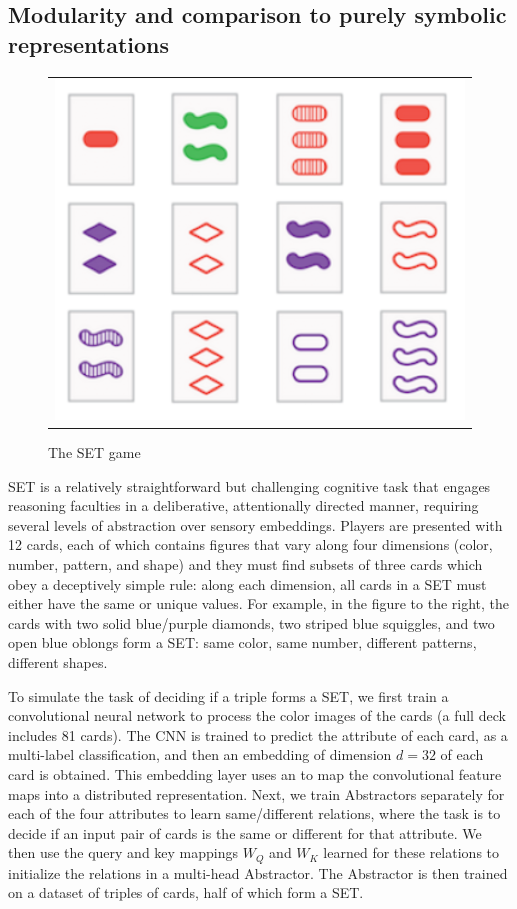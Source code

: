 \subsection{Modularity and comparison to purely symbolic representations}\label{ssec:set_exp}


\begin{figure}
	\vskip-5pt
	\begin{tabular}{c}
		\includegraphics[width=.25\textwidth]{figures/set_example}\\[-5pt]
	\end{tabular}
	\caption{\footnotesize The SET game}
\end{figure}
SET is a relatively straightforward but challenging cognitive task that engages reasoning faculties in a deliberative, attentionally directed manner, requiring several levels of abstraction over sensory embeddings. Players are
presented with 12 cards, each of which contains figures that vary along four dimensions (color, number, pattern, and
shape) and they must find subsets of three cards which obey a deceptively simple rule: along each dimension, all cards in a SET must either have the same or unique values.
For example, in the figure to the right, the cards with two solid blue/purple diamonds, two striped blue squiggles, and two open blue oblongs form a SET: same color, same number, different patterns, different shapes.

To simulate the task of deciding if a triple forms a SET, we first train a convolutional neural network to process the color images of the cards (a full deck includes 81 cards). The CNN is trained to predict the attribute of
each card, as a multi-label classification, and then an embedding of dimension $d=32$ of 
each card is obtained. This embedding layer uses an \MLP{} to map the convolutional feature maps into a distributed
representation. Next, we train Abstractors separately for each of the four attributes to learn same/different
relations, where the task is to decide if an input pair of cards is the same or different for that attribute. 
We then use the query and key mappings $W_Q$ and $W_K$ learned for these relations to initialize the relations
in a multi-head Abstractor. The Abstractor is then trained on a dataset of triples of cards, half of which form a SET. 

